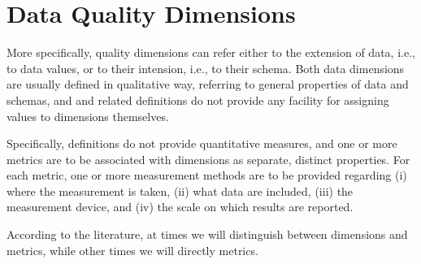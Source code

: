 \chapter{Data Quality Dimensions}

\ifpdf
    \graphicspath{{Chapter2/Figs/Raster/}{Chapter2/Figs/PDF/}{Chapter2/Figs/}}
\else
    \graphicspath{{Chapter2/Figs/Vector/}{Chapter2/Figs/}}
\fi


More specifically, quality dimensions can refer either to the extension of data, i.e., to data values, or to their 
intension, i.e., to their schema. Both data dimensions are usually defined in qualitative way, referring to general properties of data and schemas,
and and related definitions do not provide any facility for assigning values to dimensions themselves. 

Specifically, definitions do not provide quantitative measures, and one or more metrics are to be associated with dimensions as separate, distinct 
properties. For each metric, one or more measurement methods are to be provided regarding (i) where the measurement is taken, (ii) what data are included, 
(iii) the measurement device, and (iv) the scale on which results are reported.

According to the literature, at times we will distinguish between dimensions and metrics, while other times we will directly metrics.

